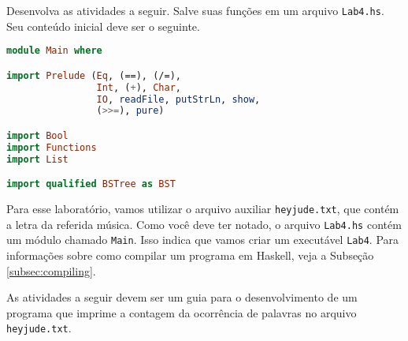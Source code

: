 \documentclass[a4paper]{article}
\begin{document}
Desenvolva as atividades a seguir.
Salve suas funções em um arquivo \texttt{Lab4.hs}.
Seu conteúdo inicial deve ser o seguinte.

\begin{lstlisting}[language=haskell, frame=single]
module Main where

import Prelude (Eq, (==), (/=),
                Int, (+), Char,
                IO, readFile, putStrLn, show,
                (>>=), pure)

import Bool
import Functions
import List

import qualified BSTree as BST
\end{lstlisting}

Para esse laboratório, vamos utilizar o arquivo auxiliar \texttt{heyjude.txt}, que contém a letra da referida música.
Como você deve ter notado, o arquivo \texttt{Lab4.hs} contém um módulo chamado \texttt{Main}.
Isso indica que vamos criar um executável \texttt{Lab4}.
Para informações sobre como compilar um programa em Haskell, veja a Subseção \ref{subsec:compiling}.

As atividades a seguir devem ser um guia para o desenvolvimento de um programa que imprime a contagem da ocorrência de palavras no arquivo \texttt{heyjude.txt}.
\end{document}
